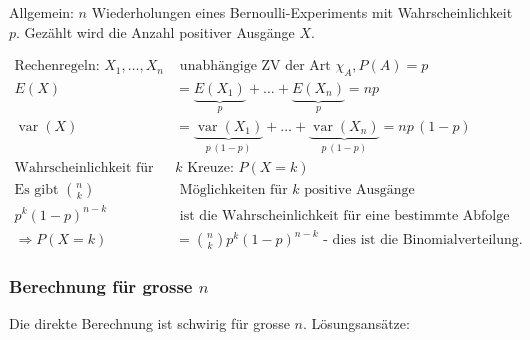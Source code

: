 \documentclass[10pt,a4paper]{scrartcl}
\newif\ifincludeDerivations
\DeclareMathOperator{\var}{var}
\begin{document}
Allgemein: $n$ Wiederholungen eines Bernoulli-Experiments mit Wahrscheinlichkeit $p$. Gezählt wird die Anzahl positiver Ausgänge $X$.

\begin{align*}
\text{Rechenregeln: } X_1, \dots, X_n  &\text{ unabhängige ZV der Art } \chi_A, P(A)= p \\
E(X) & = \underbrace{E(X_1)}_{p} + \dots + \underbrace{E(X_n)}_{p} = np \\
\var(X) & = \underbrace{\var(X_1)}_{p\,(1-p)} + \dots + \underbrace{\var(X_n)}_{p\,(1-p)} = np\,(1-p) \\
\text{Wahrscheinlichkeit für } &k \text{ Kreuze: } P(X = k) \\
\text{Es gibt } \binom{n}{k} &\text{ Möglichkeiten für } k \text{ positive Ausgänge} \\ 
p^k(1-p)^{n-k} &\text{ ist die Wahrscheinlichkeit für eine bestimmte Abfolge von Ausgängen} \\
\Rightarrow P(X=k) &= \binom{n}{k} p^k(1-p)^{n-k} \text{ - dies ist die Binomialverteilung.}
\end{align*}
\fi
\ifincludeDerivations
\paragraph{Berechnung des Erwartungswertes aus $P(X=k)$} 

\begin{align*}
E(X) &= \sum_{k=0}^{n} k \binom{n}{k} p^k(1-p)^{n-k} \\
     &= \sum_{k=1}^{n} \binom{n}{k} k p^{k-1}p (1-p)^{n-k} & x = p, y = p-1 \\
     &= \sum_{k=1}^{n} p \binom{n}{k} \underbrace{k x^{k-1}}_{\frac{d}{dx} x^k} y^{n-k} \\
     & = p \frac{d}{dx} \sum_{k=0}^{n} \binom{n}{k}x^k y^{n-k} \\
     & = p \frac{d}{dx} (x+y)^n \\
     & = p n (x+y)^{n-1} = pn(p + 1-p)^{n-1} \\
     & = np
\end{align*}
\fi

\subsubsection{Berechnung für grosse $n$}
Die direkte Berechnung ist schwirig für grosse $n$. Lösungsansätze:
\end{document}
